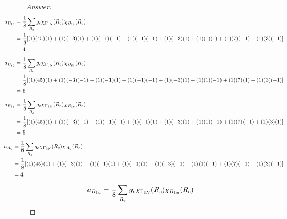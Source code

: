 \documentclass[../psets.tex]{subfiles}
\begin{document}
\begin{enumerate}[label={\Roman*)}]
\begin{enumerate}[label={\alph*)}]
\begin{proof}[Answer]
\begin{align*}
                \hspace{-4em}a_{B_{1g}} &= \frac{1}{8}\sum_{R_c}g_c\chi_{\Gamma_{3N}}(R_c)\chi_{B_{1g}}(R_c)\\
                \hspace{-4em}&= \frac{1}{8}[(1)(45)(1)+(1)(-3)(1)+(1)(-1)(-1)+(1)(-1)(-1)+(1)(-3)(1)+(1)(1)(1)+(1)(7)(-1)+(1)(3)(-1)]\\
                \hspace{-4em}&= 4
            \end{align*}
            \begin{align*}
                \hspace{-4em}a_{B_{2g}} &= \frac{1}{8}\sum_{R_c}g_c\chi_{\Gamma_{3N}}(R_c)\chi_{B_{2g}}(R_c)\\
                \hspace{-4em}&= \frac{1}{8}[(1)(45)(1)+(1)(-3)(-1)+(1)(-1)(1)+(1)(-1)(-1)+(1)(-3)(1)+(1)(1)(-1)+(1)(7)(1)+(1)(3)(-1)]\\
                \hspace{-4em}&= 6
            \end{align*}
            \begin{align*}
                \hspace{-4em}a_{B_{3g}} &= \frac{1}{8}\sum_{R_c}g_c\chi_{\Gamma_{3N}}(R_c)\chi_{B_{3g}}(R_c)\\
                \hspace{-4em}&= \frac{1}{8}[(1)(45)(1)+(1)(-3)(-1)+(1)(-1)(-1)+(1)(-1)(1)+(1)(-3)(1)+(1)(1)(-1)+(1)(7)(-1)+(1)(3)(1)]\\
                \hspace{-4em}&= 5
            \end{align*}
            \begin{align*}
                \hspace{-4em}a_{A_u}    &= \frac{1}{8}\sum_{R_c}g_c\chi_{\Gamma_{3N}}(R_c)\chi_{A_u}(R_c)\\
                \hspace{-4em}&= \frac{1}{8}[(1)(45)(1)+(1)(-3)(1)+(1)(-1)(1)+(1)(-1)(1)+(1)(-3)(-1)+(1)(1)(-1)+(1)(7)(-1)+(1)(3)(-1)]\\
                \hspace{-4em}&= 4
            \end{align*}
            \begin{align*}
                \hspace{-4em}a_{B_{1u}} &= \frac{1}{8}\sum_{R_c}g_c\chi_{\Gamma_{3N}}(R_c)\chi_{B_{1u}}(R_c)\\

\end{align*}
\end{proof}
\end{enumerate}
\end{enumerate}
\end{document}
